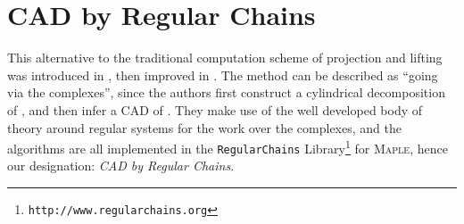 \documentclass[runningheads,a4paper]{llncs}
\begin{document}
\section{CAD by Regular Chains}
\label{sec:RC}

This alternative to the traditional computation scheme of projection and lifting was introduced in \cite{Chenetal2009d}, then improved in \cite{ChenMorenoMaza2012a}.  The method can be described as ``going via the complexes'', since the authors first construct a cylindrical decomposition of , and then infer a CAD of .  They make use of the well developed body of theory around regular systems \cite{Wang2000} for the work over the complexes, and the algorithms are all implemented in the \texttt{RegularChains} Library\footnote{\texttt{http://www.regularchains.org}} for \textsc{Maple}, hence our designation: \emph{CAD by Regular Chains}.
\end{document}

